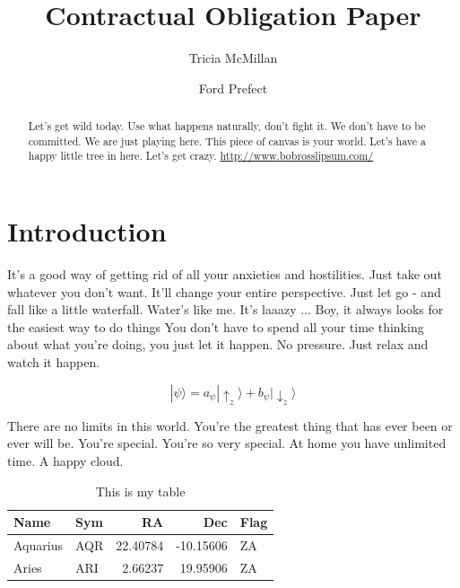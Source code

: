 \documentclass[twocolumn]{aastex701}
\begin{document}
\title{Contractual Obligation Paper}

\author{Tricia McMillan}

\author{Ford Prefect}



\begin{abstract}

Let's get wild today. Use what happens naturally, don't fight it. We
don't have to be committed. We are just playing here.
This piece of canvas is your world. Let's have a happy little tree in
here. Let's get crazy. \url{http://www.bobrosslipsum.com/}

\end{abstract}

\section{Introduction}

It's a good way of getting rid of all your anxieties and hostilities.
Just take out whatever you don't want. It'll change your entire
perspective. Just let go - and fall like a little waterfall. Water's
like me. It's laaazy ... Boy, it always looks for the easiest way to do
things You don't have to spend all your time thinking about what you're
doing, you just let it happen. No pressure. Just relax and watch it
happen.

\begin{equation}
    |\psi \rangle =a_{\psi }|\uparrow _{z}\rangle +b_{\psi }|\downarrow _{z}\rangle 
\end{equation}

There are no limits in this world. You're the greatest thing that has
ever been or ever will be. You're special. You're so very special. At
home you have unlimited time. A happy cloud.

\begin{table}
\caption{This is my table}
\begin{tabular}{llrrl}
\toprule
        Name &  Sym &        RA &       Dec & Flag \\
\midrule
    Aquarius &  AQR &  22.40784 & -10.15606 &   ZA \\
       Aries &  ARI &   2.66237 &  19.95906 &   ZA \\
\bottomrule
\end{tabular}
\end{table}
\end{document}
